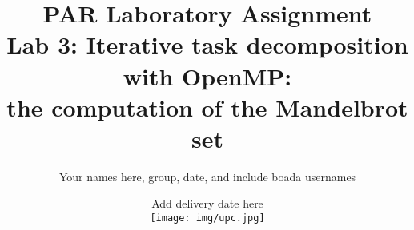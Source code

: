 \documentclass[a4paper]{report}
\begin{document}
\title{PAR Laboratory Assignment \\ Lab 3: Iterative task decomposition with OpenMP: \\ the computation of the Mandelbrot set}
\author{Your names here, group, date, and include boada usernames}
\date{Add delivery date here \\ \vspace{14cm} \texttt{[image: img/upc.jpg]}}

\maketitle

\newcommand{\omp} {\emph{OpenMP}\xspace}
\newcommand{\xtrae} {\emph{Extrae}\xspace}
\newcommand{\prver} {\emph{Paraver}\xspace}
\newcommand{\tareador} {\emph{Tareador}\xspace}
\newcommand{\make} {\texttt{Makefile}\xspace}

\renewcommand{\contentsname}{Index}

\renewcommand{\chaptername}{}
\vspace{0.25cm}

\end{document}
